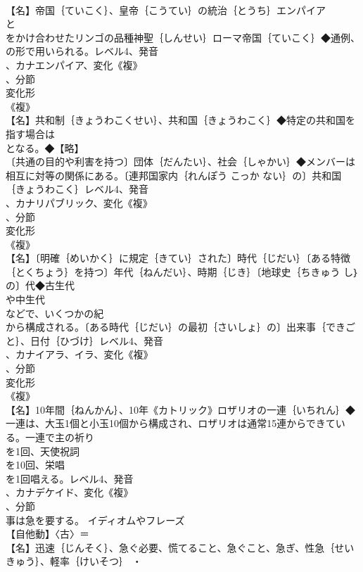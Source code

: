 \documentclass[8pt]{extreport}
\begin{document}
\begin{CJK}{UTF8}{min}
\\	【名】帝国｛ていこく｝、皇帝｛こうてい｝の統治｛とうち｝エンパイア
\\	と
\\	をかけ合わせたリンゴの品種神聖｛しんせい｝ローマ帝国｛ていこく｝◆通例、
\\	の形で用いられる。レベル4、発音
\\	、カナエンパイア、変化《複》
\\	、分節
\\	変化形 
\\	《複》
\\	【名】共和制｛きょうわこくせい｝、共和国｛きょうわこく｝◆特定の共和国を指す場合は
\\	となる。◆【略】
\\	〔共通の目的や利害を持つ〕団体｛だんたい｝、社会｛しゃかい｝◆メンバーは相互に対等の関係にある。〔連邦国家内｛れんぽう こっか ない｝の〕共和国｛きょうわこく｝レベル4、発音
\\	、カナリパブリック、変化《複》
\\	、分節
\\	変化形 
\\	《複》
\\	【名】〔明確｛めいかく｝に規定｛きてい｝された〕時代｛じだい｝〔ある特徴｛とくちょう｝を持つ〕年代｛ねんだい｝、時期｛じき｝〔地球史｛ちきゅう し｝の〕代◆古生代
\\	や中生代
\\	などで、いくつかの紀
\\	から構成される。〔ある時代｛じだい｝の最初｛さいしょ｝の〕出来事｛できごと｝、日付｛ひづけ｝レベル4、発音
\\	、カナイアラ、イラ、変化《複》
\\	、分節
\\	変化形 
\\	《複》
\\	【名】10年間｛ねんかん｝、10年《カトリック》ロザリオの一連｛いちれん｝◆一連は、大玉1個と小玉10個から構成され、ロザリオは通常15連からできている。一連で主の祈り
\\	を1回、天使祝詞
\\	を10回、栄唱
\\	を1回唱える。レベル4、発音
\\	、カナデケイド、変化《複》
\\	、分節
\\	事は急を要する。	イディオムやフレーズ 
\\	【自他動】〈古〉＝
\\	【名】迅速｛じんそく｝、急ぐ必要、慌てること、急ぐこと、急ぎ、性急｛せいきゅう｝、軽率｛けいそつ｝ ・

\end{CJK}
\end{document}
